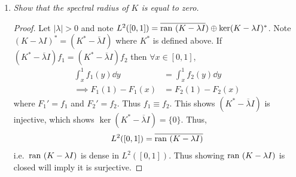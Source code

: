 \documentclass{article} %
\theoremstyle{plain}
\newcommand{\ran}{\text{\rm ran }}
\numberwithin{equation}{section} %
\numberwithin{figure}{section} %
\numberwithin{table}{section} %
\begin{document}
\begin{enumerate}[\it a)]
\begin{proof}
            Let $\norm{f} = 1$.  Then
            \begin{align*}
                \norm{Kf}^2 &= \int_0^1 (Kf)^2\dd x = \int_0^1 \qty(\int_0^x|f(y)|\dd y)^2\dd x = \int_0^1 \qty(\int_0^x\sqrt{\cos\frac{\pi}{2}y}\frac{|f(y)|}{\sqrt{\cos\frac{\pi}{2}}}\dd y)^2\dd x \\
                &\leq \int_0^1 \qty(\int_0^1 \cos \frac{\pi}{2}y\dd y)\qty(\int_0^x\frac{|f(y)|^2}{\cos\frac{\pi}{2}y})\dd x = \frac{2}{\pi}\int_0^1 \sin\qty(\frac{\pi}{2}x)\qty(\int_0^x \frac{|f(y)|^2}{\cos\frac{\pi}{2}y}\dd y)\dd x \\
                &= \frac{2}{\pi}\int_0^1 \frac{|f(y)|^2}{\cos\frac{\pi}{2}y}\qty(\int_y^1 \sin\qty(\frac{\pi}{2}x)\dd x)\dd y = \frac{4}{\pi^2}\int_0^1 |f(y)|^2 \dd y \\
                &= \frac{4}{\pi^2}\norm{f}^2 = \frac{4}{\pi^2}
            \end{align*}
            Thus $\norm{K} \leq \dfrac{2}{\pi}$.  Thus,
            \begin{align*}
                \norm{K} = \frac{2}{\pi}.
            \end{align*}
        \end{proof}
    \item
        \emph{Show that the spectral radius of $K$ is equal to zero.}
        \begin{proof}
            Let $|\lambda| > 0$ and note $L^2([0,1]) = \overline{\ran(K - \lambda I}) \oplus \ker(K - \lambda I)^*$.  Note $(K - \lambda I)^* = (K^* - \overline{\lambda}I)$ where $K^*$ is defined above.  If $(K^* - \overline{\lambda}I)f_1 = (K^* - \overline{\lambda}I)f_2$ then $\forall x \in [0,1]$,
            \begin{align*}
                \int_x^1f_1(y) \dd y &= \int_x^1 f_2(y) \dd y \\
                \implies F_1(1) - F_1(x) &= F_2(1) - F_2(x)
            \end{align*}
            where $F_1' = f_1$ and $F_2' = f_2$.  Thus $f_1 \equiv f_2$.  This shows $(K^* - \overline{\lambda}I)$ is injective, which shows $\ker(K^* - \overline{\lambda}I) = \{0\}$.  Thus,
            \begin{align*}
                L^2([0,1]) = \overline{\ran(K - \lambda I)}
            \end{align*}
            i.e.~$\ran(K - \lambda I)$ is dense in $L^2([0,1])$.  Thus showing $\ran(K - \lambda I)$ is closed will imply it is surjective.


\end{proof}
\end{enumerate}
\end{document}
